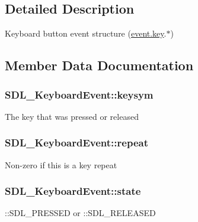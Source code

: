 \subsection{Detailed Description}
Keyboard button event structure (\hyperlink{unionSDL__Event_ab99927835cc77a9b6bb50b419b4a27df}{event.\+key}.$\ast$) 

\subsection{Member Data Documentation}
\hypertarget{structSDL__KeyboardEvent_a2a57ba820a298f2c02ad5d41fd2b1aa8}{}
\subsubsection[{keysym}]{ S\+D\+L\+\_\+\+Keyboard\+Event\+::keysym}\label{structSDL__KeyboardEvent_a2a57ba820a298f2c02ad5d41fd2b1aa8}
The key that was pressed or released \hypertarget{structSDL__KeyboardEvent_a3edac3b36304812d533795c9df4ed4c1}{}
\subsubsection[{repeat}]{ S\+D\+L\+\_\+\+Keyboard\+Event\+::repeat}\label{structSDL__KeyboardEvent_a3edac3b36304812d533795c9df4ed4c1}
Non-\/zero if this is a key repeat \hypertarget{structSDL__KeyboardEvent_a110558eb96c113c86cfa31a7018c2346}{}
\subsubsection[{state}]{ S\+D\+L\+\_\+\+Keyboard\+Event\+::state}\label{structSDL__KeyboardEvent_a110558eb96c113c86cfa31a7018c2346}
\+::\+S\+D\+L\+\_\+\+P\+R\+E\+S\+S\+E\+D or \+::\+S\+D\+L\+\_\+\+R\+E\+L\+E\+A\+S\+E\+D \hypertarget{structSDL__KeyboardEvent_ae0b2f2aace6f80c1f47e5a14350d409a}{}
